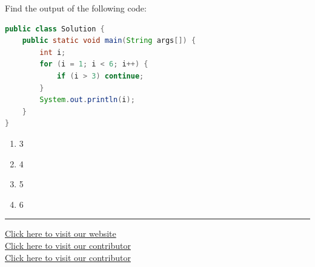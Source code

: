 \documentclass[11pt,a4paper]{article}
\begin{document}
\begin{parts}
  \item Find the output of the following code:

\begin{lstlisting}[language=Java]
public class Solution {
    public static void main(String args[]) {
        int i;
        for (i = 1; i < 6; i++) {
            if (i > 3) continue;
        }
        System.out.println(i);
    }
}
\end{lstlisting}
  
\begin{enumerate}[label=(\alph*),itemsep=2pt]
    \item 3
    \item 4
    \item 5
    \item 6
  \end{enumerate}
\end{parts}

\vfill\vfill
\rule{\linewidth}{0.4pt}

\begin{center}\small
\href{https://bhu-exam.vercel.app/}{Click here to visit our website}\\[4pt]\href{https://me-aryan.vercel.app/}{Click here to visit our contributor}\\[4pt]\href{https://quashan-me.vercel.app/}{Click here to visit our contributor}
\end{center}
\end{document}
